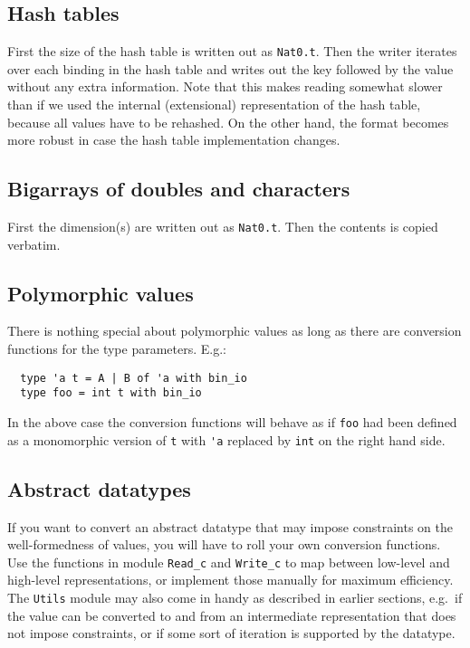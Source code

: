 \documentclass[12pt]{article}
\begin{document}
\subsection{Hash tables}

First the size of the hash table is written out as \verb=Nat0.t=.  Then the
writer iterates over each binding in the hash table and writes out the
key followed by the value without any extra information.  Note that this
makes reading somewhat slower than if we used the internal (extensional)
representation of the hash table, because all values have to be rehashed.
On the other hand, the format becomes more robust in case the hash table
implementation changes.

\subsection{Bigarrays of doubles and characters}

First the dimension(s) are written out as \verb=Nat0.t=.  Then the contents
is copied verbatim.

\subsection{Polymorphic values}

There is nothing special about polymorphic values as long as there are
conversion functions for the type parameters.  E.g.:

\begin{verbatim}
  type 'a t = A | B of 'a with bin_io
  type foo = int t with bin_io
\end{verbatim}

In the above case the conversion functions will behave as if \verb=foo= had
been defined as a monomorphic version of \verb=t= with \verb='a= replaced
by \verb=int= on the right hand side.

\subsection{Abstract datatypes}

If you want to convert an abstract datatype that may impose constraints on
the well-formedness of values, you will have to roll your own conversion
functions.  Use the functions in module \verb=Read_c= and \verb=Write_c=
to map between low-level and high-level representations, or implement those
manually for maximum efficiency.  The \verb=Utils= module may also come in
handy as described in earlier sections, e.g.\ if the value can be converted
to and from an intermediate representation that does not impose constraints,
or if some sort of iteration is supported by the datatype.
\end{document}
